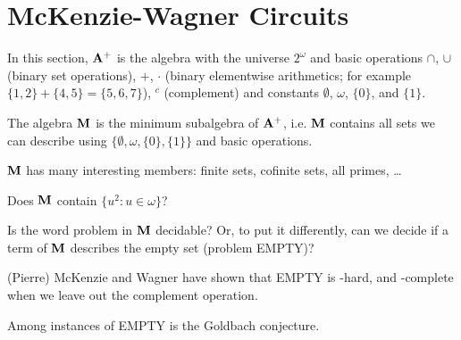\section{McKenzie-Wagner Circuits}
In this section, ${\mathbf{A}}^{+}$ is the algebra with the universe $2^\omega$ and basic
operations $\cap$, $\cup$ (binary set operations), $+$, $\cdot$ (binary
elementwise 
arithmetics; for
example $\{1,2\}+\{4,5\}=\{5,6,7\}$), ${}^{c}$ (complement) and constants 
$\emptyset$, $\omega$, $\{0\}$, and $\{1\}$.

The algebra ${\mathbf{M}}$ is the minimum subalgebra of ${\mathbf{A}}^{+}$, i.e. ${\mathbf{M}}$ contains
all sets we can describe using $\{\emptyset,\omega, \{0\},\{1\}\}$ and basic
operations.

${\mathbf{M}}$ has many interesting members: finite sets, cofinite sets, all primes,
\dots
\begin{question}
  Does ${\mathbf{M}}$ contain $\{u^2\colon u\in\omega\}$?
\end{question}
\begin{question}
  Is the word problem in ${\mathbf{M}}$ decidable? Or, to put it differently, can we
  decide if a term of ${\mathbf{M}}$ describes the empty set (problem EMPTY)?
\end{question}
\begin{context}
  (Pierre) McKenzie and Wagner have shown that EMPTY is \compNEXPTIME-hard, and
  \compNEXPTIME-complete when we leave out the complement operation.

  Among instances of EMPTY is the Goldbach conjecture.
\end{context}




